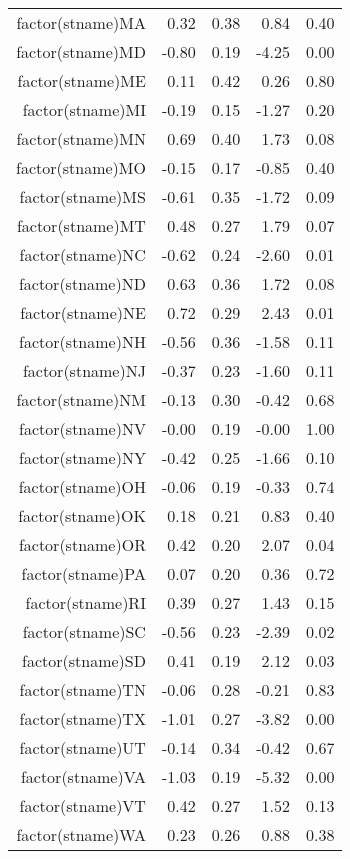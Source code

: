 \begin{table}[ht]
\begin{tabular}{rrrrr}
  factor(stname)MA & 0.32 & 0.38 & 0.84 & 0.40 \\ 
  factor(stname)MD & -0.80 & 0.19 & -4.25 & 0.00 \\ 
  factor(stname)ME & 0.11 & 0.42 & 0.26 & 0.80 \\ 
  factor(stname)MI & -0.19 & 0.15 & -1.27 & 0.20 \\ 
  factor(stname)MN & 0.69 & 0.40 & 1.73 & 0.08 \\ 
  factor(stname)MO & -0.15 & 0.17 & -0.85 & 0.40 \\ 
  factor(stname)MS & -0.61 & 0.35 & -1.72 & 0.09 \\ 
  factor(stname)MT & 0.48 & 0.27 & 1.79 & 0.07 \\ 
  factor(stname)NC & -0.62 & 0.24 & -2.60 & 0.01 \\ 
  factor(stname)ND & 0.63 & 0.36 & 1.72 & 0.08 \\ 
  factor(stname)NE & 0.72 & 0.29 & 2.43 & 0.01 \\ 
  factor(stname)NH & -0.56 & 0.36 & -1.58 & 0.11 \\ 
  factor(stname)NJ & -0.37 & 0.23 & -1.60 & 0.11 \\ 
  factor(stname)NM & -0.13 & 0.30 & -0.42 & 0.68 \\ 
  factor(stname)NV & -0.00 & 0.19 & -0.00 & 1.00 \\ 
  factor(stname)NY & -0.42 & 0.25 & -1.66 & 0.10 \\ 
  factor(stname)OH & -0.06 & 0.19 & -0.33 & 0.74 \\ 
  factor(stname)OK & 0.18 & 0.21 & 0.83 & 0.40 \\ 
  factor(stname)OR & 0.42 & 0.20 & 2.07 & 0.04 \\ 
  factor(stname)PA & 0.07 & 0.20 & 0.36 & 0.72 \\ 
  factor(stname)RI & 0.39 & 0.27 & 1.43 & 0.15 \\ 
  factor(stname)SC & -0.56 & 0.23 & -2.39 & 0.02 \\ 
  factor(stname)SD & 0.41 & 0.19 & 2.12 & 0.03 \\ 
  factor(stname)TN & -0.06 & 0.28 & -0.21 & 0.83 \\ 
  factor(stname)TX & -1.01 & 0.27 & -3.82 & 0.00 \\ 
  factor(stname)UT & -0.14 & 0.34 & -0.42 & 0.67 \\ 
  factor(stname)VA & -1.03 & 0.19 & -5.32 & 0.00 \\ 
  factor(stname)VT & 0.42 & 0.27 & 1.52 & 0.13 \\ 
  factor(stname)WA & 0.23 & 0.26 & 0.88 & 0.38 \\ 

\end{tabular}
\end{table}
